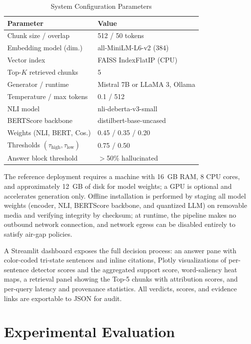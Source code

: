 \documentclass[journal]{IEEEtran}
\begin{document}
\begin{table}[!t]
\caption{System Configuration Parameters}
\label{tab:config}
\centering
\small
\begin{tabular}{@{}p{}p{}@{}}
\toprule
Parameter & Value \\
\midrule
Chunk size / overlap & 512 / 50 tokens \\
Embedding model (dim.) & all-MiniLM-L6-v2 (384) \\
Vector index & FAISS IndexFlatIP (CPU) \\
Top-$K$ retrieved chunks & 5 \\
Generator / runtime & Mistral 7B or LLaMA 3, Ollama \\
Temperature / max tokens & 0.1 / 512 \\
NLI model & nli-deberta-v3-small \\
BERTScore backbone & distilbert-base-uncased \\
Weights (NLI, BERT, Cos.) & 0.45 / 0.35 / 0.20 \\
Thresholds $(\tau_{\mathrm{high}}, \tau_{\mathrm{low}})$ & 0.75 / 0.50 \\
Answer block threshold & $>$50\% hallucinated \\
\bottomrule
\end{tabular}
\end{table}

The reference deployment requires a machine with 16~GB RAM, 8 CPU cores, and
approximately 12~GB of disk for model weights; a GPU is optional and
accelerates generation only. Offline installation is performed by staging
all model weights (encoder, NLI, BERTScore backbone, and quantized LLM) on
removable media and verifying integrity by checksum; at runtime, the
pipeline makes no outbound network connection, and network egress can be
disabled entirely to satisfy air-gap policies.

A Streamlit dashboard exposes the full decision process: an answer pane with
color-coded tri-state sentences and inline citations, Plotly visualizations
of per-sentence detector scores and the aggregated support score,
word-saliency heat maps, a retrieval panel showing the Top-5 chunks with
attribution scores, and per-query latency and provenance statistics. All
verdicts, scores, and evidence links are exportable to JSON for audit.

\section{Experimental Evaluation}
\end{document}
